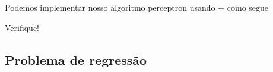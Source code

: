 \ifispython
Podemos implementar nosso algoritmo perceptron usando {\python}+{\pytorch} como segue



Verifique!
\fi


\subsection{Problema de regressão}

\emconstrucao

